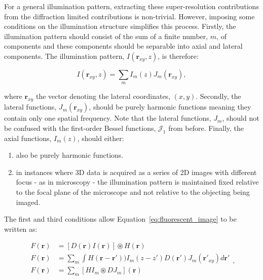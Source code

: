 For a general illumination pattern, extracting these super-resolution 
contributions from the diffraction limited contributions is non-trivial.
However, imposing some conditions on the illumination structure simplifies
this process\cite{gustafsson2008three}. Firstly, the illumination pattern 
should consist of the sum of a finite number, $m$, of components and these
components should be separable into axial and lateral components. The 
illumination pattern, $I(\textbf{r}_{xy},z)$, is therefore:

\begin{equation}\label{eq:illumination_components}
I(\textbf{r}_{xy},z) = \sum\limits_{m}{I_{m}(z)J_{m}(\textbf{r}_{xy})},
\end{equation}

where $\textbf{r}_{xy}$ the vector denoting the lateral coordinates, $(x,y)$.
Secondly, the lateral functions, $J_{m}(\textbf{r}_{xy})$, should be purely
harmonic functions meaning they contain only one spatial frequency. Note that 
the lateral functions, $J_{m}$, should not be confused with the first-order 
Bessel functions, $\mathcal{J}_{1}$ from before. Finally, the axial 
functions, $I_{m}(z)$, should either: 

\begin{enumerate}
	\item also be purely harmonic functions.
	\item in instances where 3D data is acquired as a series of 2D images with 
	different focus - as in microscopy - the illumination pattern is maintained 
	fixed relative to the focal plane of the microscope and not relative to the
	objecting being imaged.
\end{enumerate}

The first and third conditions allow Equation~\ref{eq:fluorescent_image} to be
written as:

\begin{equation}\label{eq:fluorescent_image_conditions}
\begin{split}
F(\textbf{r}) &= [D(\textbf{r})I(\textbf{r})] \circledast H(\textbf{r})\\
F(\textbf{r}) &= \sum\limits_{m}{\int H(\textbf{r}-\textbf{r}'))I_{m}(z - z')D(\textbf{r}')J_{m}(\textbf{r}'_{xy})}d\textbf{r}'\\
F(\textbf{r}) &= \sum\limits_{m}{\left[HI_{m}\circledast DJ_{m}\right](\textbf{r})}\\
\end{split},
\end{equation}

